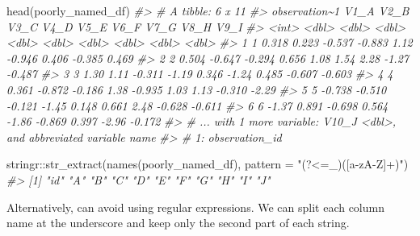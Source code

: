 \documentclass[
  12pt,
]{book}
\newenvironment{Shaded}{\begin{snugshade}}{\end{snugshade}}
\newcommand{\AttributeTok}[1]{\textcolor[rgb]{0.77,0.63,0.00}{#1}}
\newcommand{\CommentTok}[1]{\textcolor[rgb]{0.56,0.35,0.01}{\textit{#1}}}
\newcommand{\FunctionTok}[1]{\textcolor[rgb]{0.00,0.00,0.00}{#1}}
\newcommand{\NormalTok}[1]{#1}
\newcommand{\SpecialCharTok}[1]{\textcolor[rgb]{0.00,0.00,0.00}{#1}}
\newcommand{\StringTok}[1]{\textcolor[rgb]{0.31,0.60,0.02}{#1}}
\begin{document}
\begin{Shaded}
\begin{Highlighting}[]
\FunctionTok{head}\NormalTok{(poorly\_named\_df)}
\CommentTok{\#\textgreater{} \# A tibble: 6 x 11}
\CommentTok{\#\textgreater{}   observation\textasciitilde{}1   V1\_A   V2\_B   V3\_C   V4\_D   V5\_E   V6\_F  V7\_G   V8\_H   V9\_I}
\CommentTok{\#\textgreater{}           \textless{}int\textgreater{}  \textless{}dbl\textgreater{}  \textless{}dbl\textgreater{}  \textless{}dbl\textgreater{}  \textless{}dbl\textgreater{}  \textless{}dbl\textgreater{}  \textless{}dbl\textgreater{} \textless{}dbl\textgreater{}  \textless{}dbl\textgreater{}  \textless{}dbl\textgreater{}}
\CommentTok{\#\textgreater{} 1             1  0.318  0.223 {-}0.537 {-}0.883  1.12  {-}0.946 0.406 {-}0.385  0.469}
\CommentTok{\#\textgreater{} 2             2  0.504 {-}0.647 {-}0.294  0.656  1.08   1.54  2.28  {-}1.27  {-}0.487}
\CommentTok{\#\textgreater{} 3             3  1.30   1.11  {-}0.311 {-}1.19   0.346 {-}1.24  0.485 {-}0.607 {-}0.603}
\CommentTok{\#\textgreater{} 4             4  0.361 {-}0.872 {-}0.186  1.38  {-}0.935  1.03  1.13  {-}0.310 {-}2.29 }
\CommentTok{\#\textgreater{} 5             5 {-}0.738 {-}0.510 {-}0.121 {-}1.45   0.148  0.661 2.48  {-}0.628 {-}0.611}
\CommentTok{\#\textgreater{} 6             6 {-}1.37   0.891 {-}0.698  0.564 {-}1.86  {-}0.869 0.397 {-}2.96  {-}0.172}
\CommentTok{\#\textgreater{} \# ... with 1 more variable: V10\_J \textless{}dbl\textgreater{}, and abbreviated variable name}
\CommentTok{\#\textgreater{} \#   1: observation\_id}
\end{Highlighting}
\end{Shaded}

\begin{Shaded}
\begin{Highlighting}[]
\NormalTok{stringr}\SpecialCharTok{::}\FunctionTok{str\_extract}\NormalTok{(}\FunctionTok{names}\NormalTok{(poorly\_named\_df), }\AttributeTok{pattern =} \StringTok{"(?\textless{}=\_)([a{-}zA{-}Z]+)"}\NormalTok{)}
\CommentTok{\#\textgreater{}  [1] "id" "A"  "B"  "C"  "D"  "E"  "F"  "G"  "H"  "I"  "J"}
\end{Highlighting}
\end{Shaded}

Alternatively, can avoid using regular expressions. We can split each column name at the underscore and keep only the second part of each string.
\end{document}
